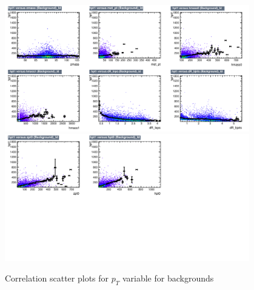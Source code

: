 \begin{figure}[!htb]%
\centering
\includegraphics[width=0.95\textwidth]{figures/CRDY/dataset/plots/correlationscatter_hpt1__Id_c3.pdf}
\includegraphics[width=0.95\textwidth]{figures/CRDY/dataset/plots/correlationscatter_hpt1__Id_c4.pdf}
\caption{ Correlation scatter plots for \HBB $p_{T}$ variable for backgrounds}%
\label{fig:correlations_CRDY_hpt1_BG}                                                       
\end{figure}



